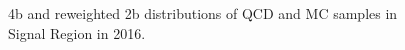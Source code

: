 \begin{figure}[ht]
 

    \caption{4b and reweighted 2b distributions of QCD and \ttbar MC samples in Signal Region in 2016.}
    \label{fig:data-weights-4b-SR-2016}
\end{figure}


